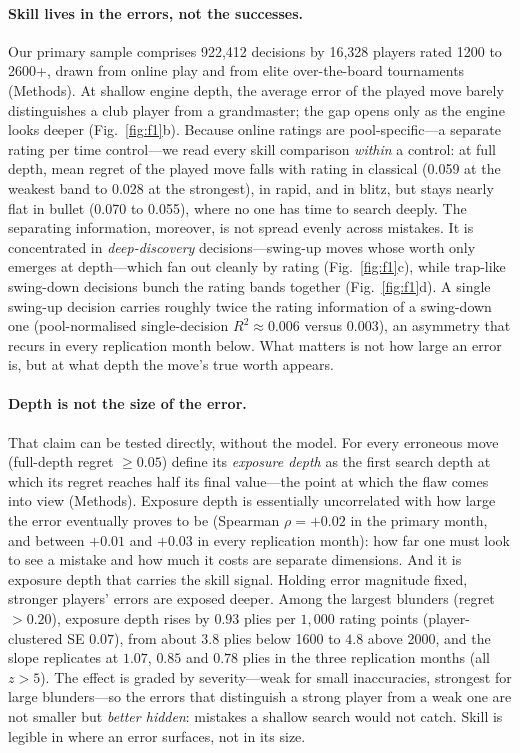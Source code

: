 \paragraph{Skill lives in the errors, not the successes.}
Our primary sample comprises 922{,}412 decisions by 16{,}328 players rated 1200 to 2600+,
drawn from online play and from elite over-the-board tournaments (Methods). At shallow engine
depth, the average error of the played move barely distinguishes a club player from a
grandmaster; the gap opens only as the engine looks deeper (Fig.~\ref{fig:f1}b). Because
online ratings are pool-specific---a separate rating per time control---we read every
skill comparison \emph{within} a control: at full depth, mean regret of the played move falls
with rating in classical (0.059 at the weakest band to 0.028 at the strongest), in rapid, and
in blitz, but stays nearly flat in bullet (0.070 to 0.055), where no one has time to search
deeply. The separating information, moreover, is not spread evenly across mistakes. It is
concentrated in \emph{deep-discovery} decisions---swing-up moves whose worth only emerges
at depth---which fan out cleanly by rating (Fig.~\ref{fig:f1}c), while trap-like
swing-down decisions bunch the rating bands together (Fig.~\ref{fig:f1}d). A single
swing-up decision carries roughly twice the rating information of a swing-down one
(pool-normalised single-decision $R^2\approx0.006$ versus $0.003$), an asymmetry that
recurs in every replication month below. What matters is not how large an error is, but at
what depth the move's true worth appears.

\paragraph{Depth is not the size of the error.}
That claim can be tested directly, without the model. For every erroneous move (full-depth
regret $\ge0.05$) define its \emph{exposure depth} as the first search depth at which its
regret reaches half its final value---the point at which the flaw comes into view (Methods).
Exposure depth is essentially uncorrelated with how large the error eventually proves to be
(Spearman $\rho=+0.02$ in the primary month, and between $+0.01$ and $+0.03$ in every
replication month): how far one must look to see a mistake and how much it costs are separate
dimensions. And it is exposure depth that carries the skill signal. Holding error magnitude
fixed, stronger players' errors are exposed deeper. Among the largest blunders (regret
$>0.20$), exposure depth rises by $0.93$ plies per $1{,}000$ rating points (player-clustered
SE $0.07$), from about $3.8$ plies below 1600 to $4.8$ above 2000, and the slope replicates at
$1.07$, $0.85$ and $0.78$ plies in the three replication months (all $z>5$). The effect is
graded by severity---weak for small inaccuracies, strongest for large blunders---so the errors
that distinguish a strong player from a weak one are not smaller but \emph{better hidden}:
mistakes a shallow search would not catch. Skill is legible in where an error surfaces, not in
its size.

